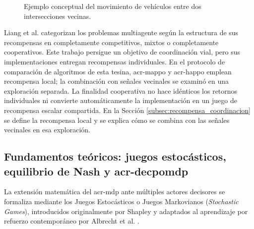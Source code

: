 \begin{figure}[!htbp]
    \caption[Movimiento entre intersecciones vecinas]{Ejemplo conceptual del movimiento de vehículos entre dos intersecciones vecinas.}
    \label{fig:marl_interaction}
\end{figure}

Liang et al. \cite{liang2025marlreview} categorizan los problemas multiagente según la estructura de sus recompensas en completamente competitivos, mixtos o completamente cooperativos. Este trabajo persigue un objetivo de coordinación vial, pero sus implementaciones entregan recompensas individuales. En el protocolo de comparación de algoritmos de esta tesina, \acrshort{acr-mappo} y \acrshort{acr-happo} emplean recompensa local; la combinación con señales vecinales se examinó en una exploración separada. La finalidad cooperativa no hace idénticos los retornos individuales ni convierte automáticamente la implementación en un juego de recompensa escalar compartida. En la Sección \ref{subsec:recompensa_coordinacion} se define la recompensa local y se explica cómo se combina con las señales vecinales en esa exploración.

\subsection[Fundamentos teóricos: juegos estocásticos, equilibrio de Nash y Dec-POMDP]{Fundamentos teóricos: juegos estocásticos, equilibrio de Nash y \acrshort{acr-decpomdp}}

La extensión matemática del \gls{acr-mdp} ante múltiples actores decisores se formaliza mediante los Juegos Estocásticos o Juegos Markovianos (\textit{Stochastic Games}), introducidos originalmente por Shapley \cite{shapley1953stochastic} y adaptados al aprendizaje por refuerzo contemporáneo por Albrecht et al. \cite{marlbook}.

